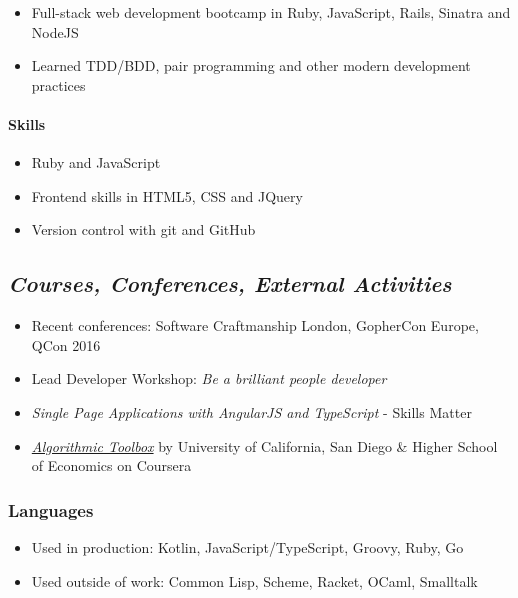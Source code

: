 \begin{itemize}
\tightlist
\item
  Full-stack web development bootcamp in Ruby, JavaScript, Rails,
  Sinatra and NodeJS
\item
  Learned TDD/BDD, pair programming and other modern development
  practices
\end{itemize}

\hypertarget{skills-2}{%
\paragraph{Skills}\label{skills-2}}

\begin{itemize}
\tightlist
\item
  Ruby and JavaScript
\item
  Frontend skills in HTML5, CSS and JQuery
\item
  Version control with git and GitHub
\end{itemize}

\hypertarget{courses-conferences-external-activities}{%
\subsection{\texorpdfstring{\emph{Courses, Conferences, External
Activities}}{Courses, Conferences, External Activities}}\label{courses-conferences-external-activities}}

\begin{itemize}
\tightlist
\item
  Recent conferences: Software Craftmanship London, GopherCon Europe,
  QCon 2016
\item
  Lead Developer Workshop: \emph{Be a brilliant people developer}
\item
  \emph{Single Page Applications with AngularJS and TypeScript} - Skills
  Matter
\item
  \href{https://www.coursera.org/account/accomplishments/records/C58NGM7GQS84}{\emph{Algorithmic
  Toolbox}} by University of California, San Diego \& Higher School of
  Economics on Coursera
\end{itemize}

\hypertarget{languages}{%
\subsubsection{Languages}\label{languages}}

\begin{itemize}
\tightlist
\item
  Used in production: Kotlin, JavaScript/TypeScript, Groovy, Ruby, Go
\item
  Used outside of work: Common Lisp, Scheme, Racket, OCaml, Smalltalk
\end{itemize}

